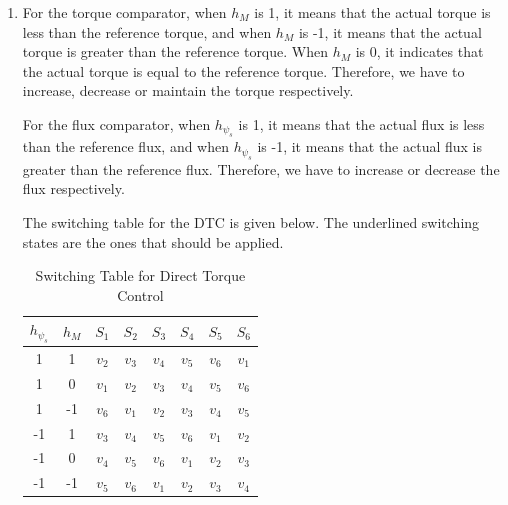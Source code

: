 \documentclass[12pt,a4paper, openany]{book}
\begin{document}
\begin{enumerate}
\begin{lstlisting}[language=Matlab, caption=Sector Determination Function]
\end{lstlisting}
    \item
    For the torque comparator, when $h_M$ is 1, it means that the actual torque is less than the reference torque, and when $h_M$ is -1, it means that the actual torque is greater than the reference torque. When $h_M$ is 0, it indicates that the actual torque is equal to the reference torque. Therefore, we have to increase, decrease or maintain the torque respectively. 

    For the flux comparator, when $h_{\psi_s}$ is 1, it means that the actual flux is less than the reference flux, and when $h_{\psi_s}$ is -1, it means that the actual flux is greater than the reference flux. Therefore, we have to increase or decrease the flux respectively.

    The switching table for the DTC is given below. The underlined switching states are the ones that should be applied.
    \begin{table}[ht]
\centering
\setlength{\tabcolsep}{8pt}
\renewcommand{\arraystretch}{1.2}
\begin{tabular}{cc*{6}{c}}
\hline
$h_{\psi_s}$ & $h_M$ & $S_1$ & $S_2$ & $S_3$ & $S_4$ & $S_5$ & $S_6$ \\
\hline
1 & 1  & \underline{$v_2$} & \underline{$v_3$} & \underline{$v_4$} & \underline{$v_5$} & \underline{$v_6$} & \underline{$v_1$} \\
1 & 0  & \underline{$v_1$} & \underline{$v_2$} & \underline{$v_3$} & \underline{$v_4$} & \underline{$v_5$} & \underline{$v_6$} \\
1 & -1 & \underline{$v_6$} & \underline{$v_1$} & \underline{$v_2$} & \underline{$v_3$} & \underline{$v_4$} & \underline{$v_5$} \\
\hline
-1 & 1  & \underline{$v_3$} & \underline{$v_4$} & \underline{$v_5$} & \underline{$v_6$} & \underline{$v_1$} & \underline{$v_2$} \\
-1 & 0  & \underline{$v_4$} & \underline{$v_5$} & \underline{$v_6$} & \underline{$v_1$} & \underline{$v_2$} & \underline{$v_3$} \\
-1 & -1 & \underline{$v_5$} & \underline{$v_6$} & \underline{$v_1$} & \underline{$v_2$} & \underline{$v_3$} & \underline{$v_4$} \\
\hline
\end{tabular}
\caption{Switching Table for Direct Torque Control}
\label{tab:dtc_switching_table}
\end{table}
\end{enumerate}
\end{document}
